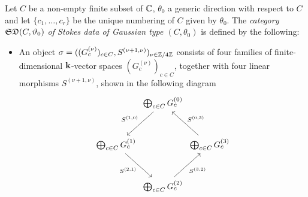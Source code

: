  \begin{defi}\label{StokesDataDefi}
     Let $C$ be a non-empty finite subset of $\mathbb{C}$, $\theta_0$ a generic direction with respect to $C$ and let $\{c_1, \dots, c_r\}$ be the unique numbering of $C$ given by $\theta_0$. The \emph{category $\mathfrak{SD}(C, \vartheta_0)$ of Stokes data of Gaussian type $(C,\theta_0)$} is defined by the following:
    \begin{itemize}
        \item An object $\sigma =((G_c^{(\nu)})_{c \in C}, S^{(\nu+1, \nu)})_{\nu \in \mathbb{Z}/4\mathbb{Z}}$ consists of four families of finite-dimensional $\mathbf{k}$-vector spaces $(G_c^{(\nu)})_{c \in C}$, together with four linear morphisms $S^{(\nu+1,\nu)}$, shown in the following diagram
        \[
         \begin{tikzcd}[row sep=1cm, column sep=0cm]
         & \bigoplus_{c \in C} G_c^{(0)} \arrow[dl, "S^{(1,0)}"'] & \\
        \bigoplus_{c \in C} G_c^{(1)} \arrow[dr, "S^{(2,1)}"'] & & \bigoplus_{c \in C} G_c^{(3)} \arrow[ul, "S^{(0,3)}" above right] \\
        & \bigoplus_{c \in C} G_c^{(2)}\arrow[ur, "S^{(3,2)}" below right] &
        \end{tikzcd}
        \]
        

\end{itemize}
\end{defi}
